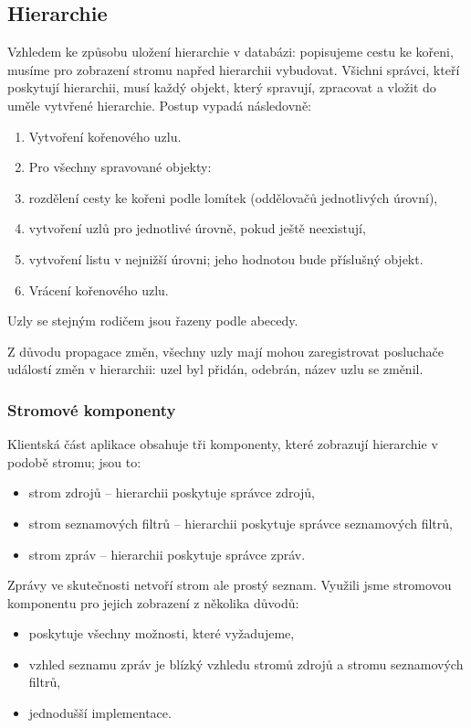 \subsection{Hierarchie}

Vzhledem ke způsobu uložení hierarchie v databázi: popisujeme cestu ke kořeni, musíme pro zobrazení stromu napřed hierarchii vybudovat.
Všichni správci, kteří poskytují hierarchii, musí každý objekt, který spravují, zpracovat a vložit do uměle vytvřené hierarchie.
Postup vypadá následovně:
\begin{enumerate}
	\item Vytvoření kořenového uzlu.
	\item Pro všechny spravované objekty:
	\item rozdělení cesty ke kořeni podle lomítek (oddělovačů jednotlivých úrovní),
	\item vytvoření uzlů pro jednotlivé úrovně, pokud ještě neexistují,
	\item vytvoření listu v nejnižší úrovni; jeho hodnotou bude příslušný objekt.
	\item Vrácení kořenového uzlu.
\end{enumerate}

Uzly se stejným rodičem jsou řazeny podle abecedy.

Z důvodu propagace změn, všechny uzly mají mohou zaregistrovat posluchače událostí změn v hierarchii: uzel byl přidán, odebrán, název uzlu se změnil.

\subsubsection{Stromové komponenty}

Klientská část aplikace obsahuje tři komponenty, které zobrazují hierarchie v podobě stromu; jsou to:
\begin{itemize}
	\item strom zdrojů -- hierarchii poskytuje správce zdrojů,
	\item strom seznamových filtrů -- hierarchii poskytuje správce seznamových filtrů,
	\item strom zpráv -- hierarchii poskytuje správce zpráv.
\end{itemize}

Zprávy ve skutečnosti netvoří strom ale prostý seznam.
Využili jsme stromovou komponentu pro jejich zobrazení z několika důvodů:
\begin{itemize}
	\item poskytuje všechny možnosti, které vyžadujeme,
	\item vzhled seznamu zpráv je blízký vzhledu stromů zdrojů a stromu seznamových filtrů,
	\item jednodušší implementace.
\end{itemize}

